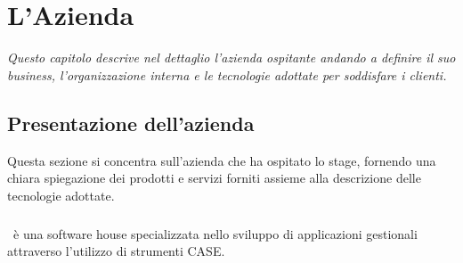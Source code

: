 

\chapter{L'Azienda}
\label{cap1:L'Azienda}






\textit{Questo capitolo descrive nel dettaglio l'azienda ospitante andando a definire il suo business, l’organizzazione interna e le tecnologie adottate per soddisfare i clienti.}

\section{Presentazione dell'azienda}
\label{cap1:Presentazione dell'azienda}
Questa sezione si concentra sull'azienda che ha ospitato lo stage, fornendo una chiara spiegazione dei prodotti e servizi forniti assieme alla descrizione delle tecnologie adottate.

\subsection{\azienda}
\label{cap1:Tepui}
\paragraph*{}\azienda\ è una software house specializzata nello sviluppo di applicazioni gestionali attraverso l'utilizzo di strumenti CASE. 


